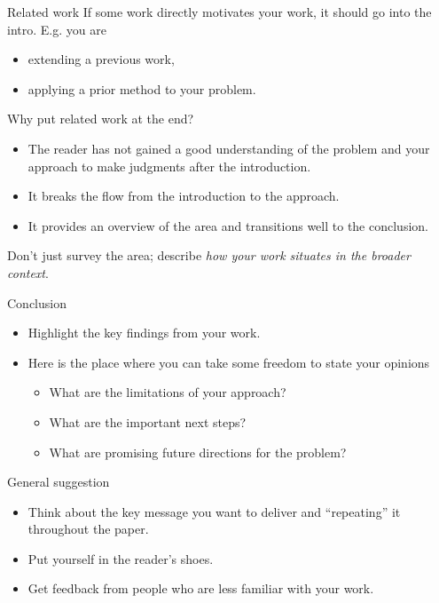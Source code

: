 \documentclass[usenames,dvipsnames,notes]{beamer}
\begin{document}
\begin{frame}
    {Related work}
    If some work directly motivates your work, it should go into the intro. E.g. you are\\
    \begin{itemize}
        \item extending a previous work,
        \item applying a prior method to your problem.
    \end{itemize}

    Why put related work at the end?\\
    \begin{itemize}
        \item The reader has not gained a good understanding of the problem and your approach to make judgments after the introduction.
        \item It breaks the flow from the introduction to the approach.
        \item It provides an overview of the area and transitions well to the conclusion.
    \end{itemize}

    Don't just survey the area; describe \emph{how your work situates in the broader context}.
\end{frame}

\begin{frame}
    {Conclusion}
    \begin{itemize}
        \item Highlight the key findings from your work.
        \item Here is the place where you can take some freedom to state your opinions
            \begin{itemize}
                \item What are the limitations of your approach?
                \item What are the important next steps?
                \item What are promising future directions for the problem?
            \end{itemize}
    \end{itemize}
\end{frame}

\begin{frame}
    {General suggestion}
    \begin{itemize}
        \item Think about the key message you want to deliver and ``repeating'' it throughout the paper.
        \item Put yourself in the reader's shoes.
        \item Get feedback from people who are less familiar with your work.
    \end{itemize}
\end{frame}
\end{document}
